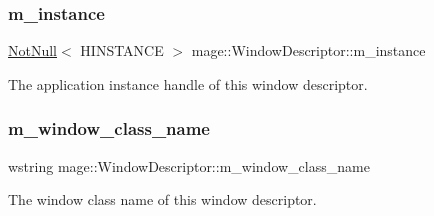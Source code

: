 \subsubsection{\texorpdfstring{m\+\_\+instance}{m\_instance}}
{\footnotesize\ttfamily \hyperlink{namespacemage_a8769f9d670d6b585ea306cb1062af94b}{Not\+Null}$<$ H\+I\+N\+S\+T\+A\+N\+CE $>$ mage\+::\+Window\+Descriptor\+::m\+\_\+instance\hspace{0.3cm}{\ttfamily [private]}}

The application instance handle of this window descriptor. \hypertarget{classmage_1_1_window_descriptor_abd3379a435cfea7aae78f4989635bfb5}{}\label{classmage_1_1_window_descriptor_abd3379a435cfea7aae78f4989635bfb5} 
\subsubsection{\texorpdfstring{m\+\_\+window\+\_\+class\+\_\+name}{m\_window\_class\_name}}
{\footnotesize\ttfamily wstring mage\+::\+Window\+Descriptor\+::m\+\_\+window\+\_\+class\+\_\+name\hspace{0.3cm}{\ttfamily [private]}}

The window class name of this window descriptor. 